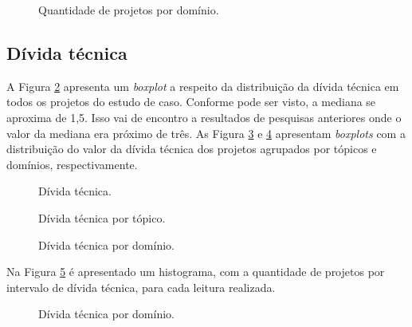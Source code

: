  \begin{figure}[H]
  \centering
  \caption{Quantidade de projetos por domínio.}
  \label{fig:projetos_por_dominio} 
\end{figure}


\subsection{Dívida técnica}

A Figura \ref{fig:boxplot_divida_tecnica} apresenta um \textit{boxplot} a respeito da distribuição da dívida técnica em todos os projetos do estudo de caso. Conforme pode ser visto, a mediana se aproxima de 1,5. Isso vai de encontro a resultados de pesquisas anteriores onde o valor da mediana era próximo de três\cite{de2017technical}. As Figura \ref{fig:divida_por_topico} e \ref{fig:divida_por_dominio} apresentam \textit{boxplots} com a distribuição do valor da dívida técnica dos projetos agrupados por tópicos e domínios, respectivamente. 


 \begin{figure}[H]
  \centering
  \caption{Dívida técnica.}
  \label{fig:boxplot_divida_tecnica} 
\end{figure}

 \begin{figure}[H]
  \centering
  \caption{Dívida técnica por tópico.}
  \label{fig:divida_por_topico} 
\end{figure}

 \begin{figure}[H]
  \centering
  \caption{Dívida técnica por domínio.}
  \label{fig:divida_por_dominio} 
\end{figure}


Na Figura \ref{fig:histograma_leitura_divida} é apresentado um histograma, com a quantidade de projetos por intervalo de dívida técnica, para cada leitura realizada. 

 \begin{figure}[H]
  \centering
  \caption{Dívida técnica por domínio.}
  \label{fig:histograma_leitura_divida} 
\end{figure}


